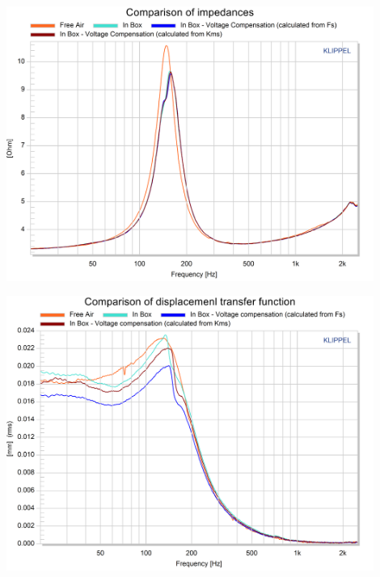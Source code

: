 \documentclass{report}
\begin{document}
\begin{minipage}{0.5\textwidth}
\begin{center}
	\includegraphics[width=0.9\textwidth]{RoomComp/Imp_Comps} 
    \captionsetup{hypcap=false} 
	\label{fig:imp_comp}
\end{center}
\end{minipage}
\begin{minipage}{0.5\textwidth}
\begin{center}
	\includegraphics[width=0.9\textwidth]{RoomComp/Disp_Comps} 
    \captionsetup{hypcap=false} 
	\label{fig:disp_comp}
\end{center}
\end{minipage}
\vspace{0.1cm}
\end{document}
